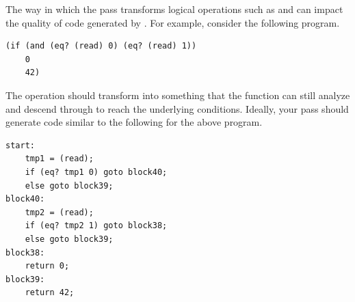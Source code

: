 \documentclass[11pt]{book}
\begin{document}



The way in which the  pass transforms logical operations
such as  and  can impact the quality of code
generated by . For example, consider the
following program.
\begin{lstlisting}
(if (and (eq? (read) 0) (eq? (read) 1))
    0
    42)  
\end{lstlisting}
The  operation should transform into something that the
 function can still analyze and descend through to
reach the underlying  conditions. Ideally, your
 pass should generate code similar to the
following for the above program.
\begin{center}
\begin{lstlisting}
start:
    tmp1 = (read);
    if (eq? tmp1 0) goto block40;
    else goto block39;
block40:
    tmp2 = (read);
    if (eq? tmp2 1) goto block38;
    else goto block39;
block38:
    return 0;
block39:
    return 42;
\end{lstlisting}
\end{center}
\end{document}
